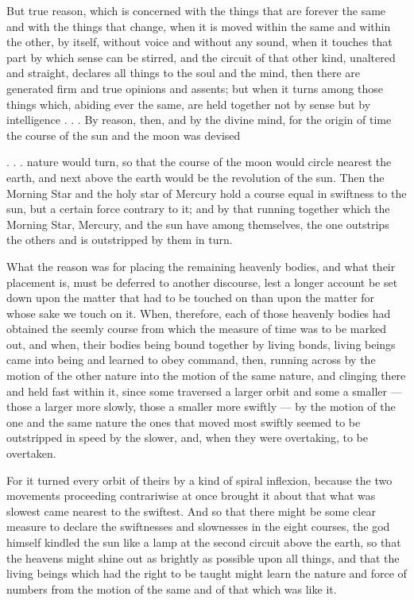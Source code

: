  But true reason, which is concerned with the things that are forever the same and with the things that change, when it is moved within the same and within the other, by itself, without voice and without any sound, when it touches that part by which sense can be stirred, and the circuit of that other kind, unaltered and straight, declares all things to the soul and the mind, then there are generated firm and true opinions and assents; but when it turns among those things which, abiding ever the same, are held together not by sense but by intelligence . . . By reason, then, and by the divine mind, for the origin of time the course of the sun and the moon was devised

 . . . nature would turn, so that the course of the moon would circle nearest the earth, and next above the earth would be the revolution of the sun. Then the Morning Star and the holy star of Mercury hold a course equal in swiftness to the sun, but a certain force contrary to it; and by that running together which the Morning Star, Mercury, and the sun have among themselves, the one outstrips the others and is outstripped by them in turn.

 What the reason was for placing the remaining heavenly bodies, and what their placement is, must be deferred to another discourse, lest a longer account be set down upon the matter that had to be touched on than upon the matter for whose sake we touch on it. When, therefore, each of those heavenly bodies had obtained the seemly course from which the measure of time was to be marked out, and when, their bodies being bound together by living bonds, living beings came into being and learned to obey command, then, running across by the motion of the other nature into the motion of the same nature, and clinging there and held fast within it, since some traversed a larger orbit and some a smaller — those a larger more slowly, those a smaller more swiftly — by the motion of the one and the same nature the ones that moved most swiftly seemed to be outstripped in speed by the slower, and, when they were overtaking, to be overtaken.

 For it turned every orbit of theirs by a kind of spiral inflexion, because the two movements proceeding contrariwise at once brought it about that what was slowest came nearest to the swiftest. And so that there might be some clear measure to declare the swiftnesses and slownesses in the eight courses, the god himself kindled the sun like a lamp at the second circuit above the earth, so that the heavens might shine out as brightly as possible upon all things, and that the living beings which had the right to be taught might learn the nature and force of numbers from the motion of the same and of that which was like it.

